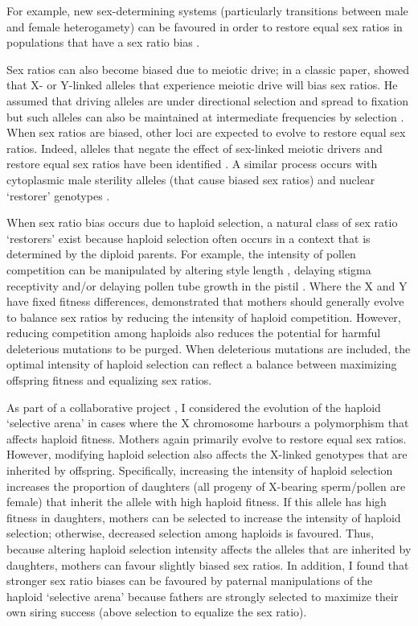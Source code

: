 \documentclass[12pt]{article}
\begin{document}
For example, new sex-determining systems (particularly transitions between male and female heterogamety) can be favoured in order to restore equal sex ratios in populations that have a sex ratio bias \citep{Bull:1983vi,Kozielska:2010vm,Ubeda:2015fx}.

Sex ratios can also become biased due to meiotic drive;
in a classic paper, \citet{Hamilton:1967ts} showed that X- or Y-linked alleles that experience meiotic drive will bias sex ratios. 
He assumed that driving alleles are under directional selection and spread to fixation but such alleles can also be maintained at intermediate frequencies by selection \citep{Feldman:1989gm,Holman:2015en}. 
When sex ratios are biased, other loci are expected to evolve to restore equal sex ratios. 
Indeed, alleles that negate the effect of sex-linked meiotic drivers and restore equal sex ratios have been identified \citep{Stalker:1961th,Smith:1975ft}. 
A similar process occurs with cytoplasmic male sterility alleles (that cause biased sex ratios) and nuclear `restorer' genotypes \citep{Frank:1989vl}. 

When sex ratio bias occurs due to haploid selection, a natural class of sex ratio `restorers' exist because haploid selection often occurs in a context that is determined by the diploid parents. 
For example, the intensity of pollen competition can be manipulated by altering style length \citep{Travers:2001,Lankinen:2001gc,Ruane:2009vt}, delaying stigma receptivity \citep{Galen:1986wq,Lankinen:2011if} and/or delaying pollen tube growth in the pistil \citep{Herrero:2003jf}. 
Where the X and Y have fixed fitness differences, \citet{Hough:2013uo} demonstrated that mothers should generally evolve to balance sex ratios by reducing the intensity of haploid competition. 
However, reducing competition among haploids also reduces the potential for harmful deleterious mutations to be purged. 
When deleterious mutations are included, the optimal intensity of haploid selection can reflect a balance between maximizing offspring fitness and equalizing sex ratios. 

As part of a collaborative project \citep{Otto:2015va}, I considered the evolution of the haploid `selective arena' in cases where the X chromosome harbours a polymorphism that affects haploid fitness. 
Mothers again primarily evolve to restore equal sex ratios.
However, modifying haploid selection also affects the X-linked genotypes that are inherited by offspring. 
Specifically, increasing the intensity of haploid selection increases the proportion of daughters (all progeny of X-bearing sperm/pollen are female) that inherit the allele with high haploid fitness. 
If this allele has high fitness in daughters, mothers can be selected to increase the intensity of haploid selection; otherwise, decreased selection among haploids is favoured.
Thus, because altering haploid selection intensity affects the alleles that are inherited by daughters, mothers can favour slightly biased sex ratios. 
In addition, I found that stronger sex ratio biases can be favoured by paternal manipulations of the haploid `selective arena' because fathers are strongly selected to maximize their own siring success (above selection to equalize the sex ratio).
\end{document}

